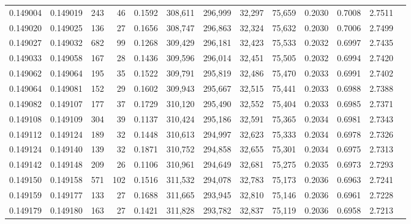 \begin{tabular}{rrrrrrrrrrrrr}
0.149004 & 0.149019 &   243 &  46 &                                     0.1592 & 308,611 & 296,999 &  32,297 &  75,659 & 0.2030 & 0.7008 & 2.7511 \\
0.149020 & 0.149025 &   136 &  27 &                                     0.1656 & 308,747 & 296,863 &  32,324 &  75,632 & 0.2030 & 0.7006 & 2.7499 \\
0.149027 & 0.149032 &   682 &  99 &                                     0.1268 & 309,429 & 296,181 &  32,423 &  75,533 & 0.2032 & 0.6997 & 2.7435 \\
0.149033 & 0.149058 &   167 &  28 &                                     0.1436 & 309,596 & 296,014 &  32,451 &  75,505 & 0.2032 & 0.6994 & 2.7420 \\
0.149062 & 0.149064 &   195 &  35 &                                     0.1522 & 309,791 & 295,819 &  32,486 &  75,470 & 0.2033 & 0.6991 & 2.7402 \\
0.149064 & 0.149081 &   152 &  29 &                                     0.1602 & 309,943 & 295,667 &  32,515 &  75,441 & 0.2033 & 0.6988 & 2.7388 \\
0.149082 & 0.149107 &   177 &  37 &                                     0.1729 & 310,120 & 295,490 &  32,552 &  75,404 & 0.2033 & 0.6985 & 2.7371 \\
0.149108 & 0.149109 &   304 &  39 &                                     0.1137 & 310,424 & 295,186 &  32,591 &  75,365 & 0.2034 & 0.6981 & 2.7343 \\
0.149112 & 0.149124 &   189 &  32 &                                     0.1448 & 310,613 & 294,997 &  32,623 &  75,333 & 0.2034 & 0.6978 & 2.7326 \\
0.149124 & 0.149140 &   139 &  32 &                                     0.1871 & 310,752 & 294,858 &  32,655 &  75,301 & 0.2034 & 0.6975 & 2.7313 \\
0.149142 & 0.149148 &   209 &  26 &                                     0.1106 & 310,961 & 294,649 &  32,681 &  75,275 & 0.2035 & 0.6973 & 2.7293 \\
0.149150 & 0.149158 &   571 & 102 &                                     0.1516 & 311,532 & 294,078 &  32,783 &  75,173 & 0.2036 & 0.6963 & 2.7241 \\
0.149159 & 0.149177 &   133 &  27 &                                     0.1688 & 311,665 & 293,945 &  32,810 &  75,146 & 0.2036 & 0.6961 & 2.7228 \\
0.149179 & 0.149180 &   163 &  27 &                                     0.1421 & 311,828 & 293,782 &  32,837 &  75,119 & 0.2036 & 0.6958 & 2.7213 \\

\end{tabular}
